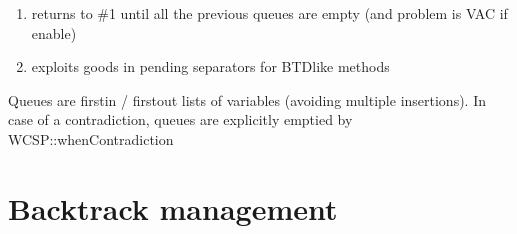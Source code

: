 \documentclass[letterpaper,10pt,openany,oneside,english]{sphinxmanual}
\begin{document}
\begin{fulllineitems}
\begin{enumerate}
\item {} 
\sphinxAtStartPar
returns to \#1 until all the previous queues are empty (and problem is VAC if enable)

\item {} 
\sphinxAtStartPar
exploits goods in pending separators for BTD\sphinxhyphen{}like methods

\end{enumerate}


\sphinxAtStartPar
Queues are first\sphinxhyphen{}in / first\sphinxhyphen{}out lists of variables (avoiding multiple insertions). In case of a contradiction, queues are explicitly emptied by WCSP::whenContradiction 

\end{fulllineitems}



\section{Backtrack management}
\label{\detokenize{ref/ref_modules:backtrack-management}}
\end{document}

